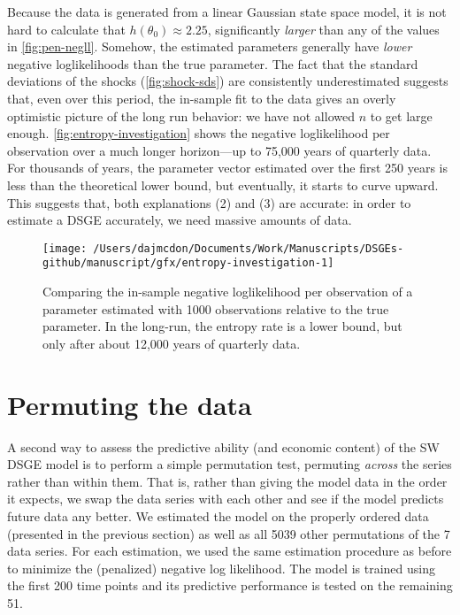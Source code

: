 \documentclass[11pt]{article}
\begin{document}
Because the data is generated from a linear Gaussian state space model,
it is not hard to calculate that \(h(\theta_0) \approx 2.25\),
significantly \emph{larger} than any of the values in
\autoref{fig:pen-negll}. Somehow, the estimated parameters generally
have \emph{lower} negative loglikelihoods than the true parameter. The
fact that the standard deviations of the shocks
(\autoref{fig:shock-sds}) are consistently underestimated suggests that,
even over this period, the in-sample fit to the data gives an overly
optimistic picture of the long run behavior: we have not allowed \(n\)
to get large enough. \autoref{fig:entropy-investigation} shows the
negative loglikelihood per observation over a much longer horizon---up
to 75,000 years of quarterly data. For thousands of years, the parameter
vector estimated over the first 250 years is less than the theoretical
lower bound, but eventually, it starts to curve upward. This suggests
that, both explanations (2) and (3) are accurate: in order to estimate a
DSGE accurately, we need massive amounts of data.

\begin{figure}[t]

{\centering \texttt{[image: /Users/dajmcdon/Documents/Work/Manuscripts/DSGEs-github/manuscript/gfx/entropy-investigation-1]} 

}

\caption{Comparing the in-sample negative loglikelihood per observation of a parameter estimated with 1000 observations relative to the true parameter. In the long-run, the entropy rate is a lower bound, but only after about 12,000 years of quarterly data.}\label{fig:entropy-investigation}
\end{figure}

\clearpage

\hypertarget{sec:permutation-summary}{%
\section{Permuting the data}\label{sec:permutation-summary}}

A second way to assess the predictive ability (and economic content) of
the SW DSGE model is to perform a simple permutation test, permuting
\emph{across} the series rather than within them. That is, rather than
giving the model data in the order it expects, we swap the data series
with each other and see if the model predicts future data any better. We
estimated the model on the properly ordered data (presented in the
previous section) as well as all 5039 other permutations of the 7 data
series. For each estimation, we used the same estimation procedure as
before to minimize the (penalized) negative log likelihood. The model is
trained using the first 200 time points and its predictive performance
is tested on the remaining 51.
\end{document}
